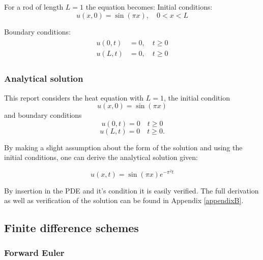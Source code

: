 For a rod of length $L = 1$ the equation becomes:
Initial conditions:
\begin{equation}
    u(x, 0) = \sin(\pi x), \quad 0 < x < L
\end{equation}

Boundary conditions:
\begin{align}
\begin{split}
    u(0,t) &= 0, \quad t\geq 0 \\
    u(L,t) &= 0, \quad t\geq 0
\end{split}
\end{align}

\subsubsection{Analytical solution}
This report considers the heat equation with $L=1$, the initial condition
\begin{equation}
u(x, 0) = \sin(\pi x)    
\end{equation}
and boundary conditions
\begin{equation}
    u(0, t)=0 \quad t\ge0
\end{equation}
\begin{equation}
    u(L, t)=0 \quad t\ge 0.
\end{equation}

By making a slight assumption about the form of the solution and using the initial conditions, one can derive the analytical solution given:

\begin{equation}\label{analytical_sol}
    u(x,t) = \sin(\pi x) e^{-\pi^2 t}
\end{equation}

By insertion in the PDE and it's condition it is easily verified. The full derivation as well as verification of the solution can be found in Appendix \ref{appendixB}.

\subsection{Finite difference schemes}\label{sec:FD}
\subsubsection{Forward Euler}


